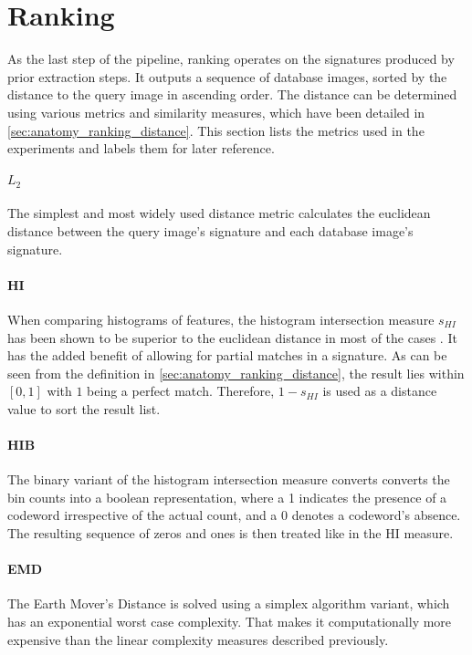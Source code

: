 \section{Ranking}

As the last step of the pipeline, ranking operates on the signatures produced
by prior extraction steps. It outputs a sequence of database images, sorted by
the distance to the query image in ascending order. The distance can be
determined using various metrics and similarity measures, which have been
detailed in \ref{sec:anatomy_ranking_distance}. This section lists the metrics
used in the experiments and labels them for later reference.

\paragraph{$L_2$}

The simplest and most widely used distance metric calculates the euclidean
distance between the query image's signature and each database image's
signature.

\paragraph{HI}

When comparing histograms of features, the histogram intersection measure
$s_{HI}$ has been shown to be superior to the euclidean distance in most of the
cases \autocite{wu_beyond_2009}. It has the added benefit of allowing for
partial matches in a signature. As can be seen from the definition in
\ref{sec:anatomy_ranking_distance}, the result lies within $[0, 1]$ with $1$
being a perfect match. Therefore, $1 - s_{HI}$ is used as a distance value to
sort the result list.

\paragraph{HIB}

The binary variant of the histogram intersection measure converts converts the
bin counts into a boolean representation, where a 1 indicates the presence of a
codeword irrespective of the actual count, and a 0 denotes a codeword's
absence. The resulting sequence of zeros and ones is then treated like in the
HI measure.

\paragraph{EMD}

The Earth Mover's Distance is solved using a simplex algorithm variant, which
has an exponential worst case complexity. That makes it computationally more
expensive than the linear complexity measures described previously.

